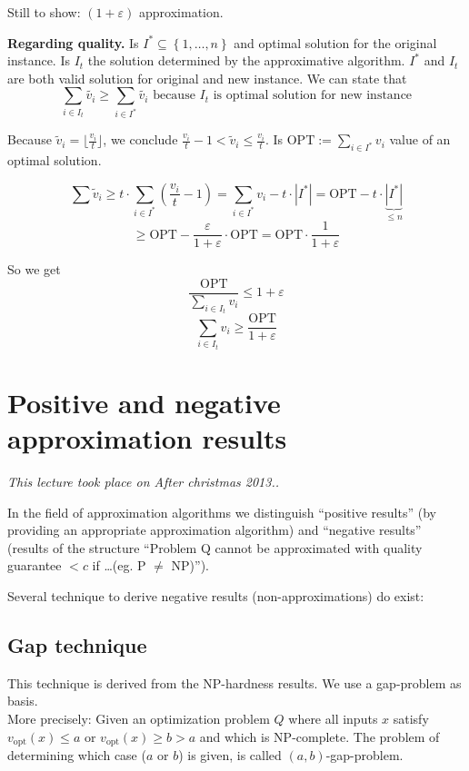 \documentclass[a4paper]{article}
\newcommand{\cls}[1]{\rm{#1}}
\newcommand{\set}[1]{\left\{#1\right\}}
\newcommand{\dateref}[1]{\emph{This lecture took place on #1.}\par}
\begin{document}
Still to show: $(1 + \varepsilon)$ approximation.

\textbf{Regarding quality.}
  Is $I^* \subseteq \set{1, \ldots, n}$ and optimal solution for the original instance.
  Is $I_t$ the solution determined by the approximative algorithm.
  $I^*$ and $I_t$ are both valid solution for original and new instance.
  We can state that
  \[
    \sum_{i \in I_t} \tilde{v_i} \geq \sum_{i \in I^*} \tilde{v_i}
    \text{ because $I_t$ is optimal solution for new instance}
  \]

Because $\tilde v_i = \lfloor \frac{v_i}{t} \rfloor$, we conclude
$\frac{v_i}{t} - 1 < \tilde v_i \leq \frac{v_i}{t}$.
Is $\text{OPT} := \sum_{i \in I^*} v_i$ value of an optimal solution.

\[
  \sum \tilde v_i \geq t \cdot \sum_{i \in I^*} (\frac{v_i}{t} - 1)
    = \sum_{i \in I^*} v_i - t \cdot |I^*|
    = \text{OPT} - t \cdot \underbrace{|I^*|}_{\leq n}
\] \[
  \geq \text{OPT} - \frac{\varepsilon}{1 + \varepsilon} \cdot \text{OPT}
    = \text{OPT} \cdot \frac{1}{1 + \varepsilon}
\]

So we get
\[
  \frac{\text{OPT}}{\sum_{i \in I_t} v_i} \leq 1 + \varepsilon
\] \[
  \sum_{i \in I_t} v_i \geq \frac{\text{OPT}}{1 + \varepsilon}
\]

\section{Positive and negative approximation results}
\dateref{After christmas 2013.}
%
In the field of approximation algorithms we distinguish ``positive results''
(by providing an appropriate approximation algorithm) and ``negative results''
(results of the structure ``Problem Q cannot be approximated with quality guarantee
$< c$ if \dots (eg. P $\neq$ \cls{NP})'').

Several technique to derive negative results (non-approximations) do exist:

\subsection{Gap technique}
%
This technique is derived from the \cls{NP}-hardness results.
We use a gap-problem as basis. \\
More precisely: Given an optimization problem $Q$ where all inputs $x$ satisfy
$v_{\text{opt}}(x) \leq a$ or $v_{\text{opt}}(x) \geq b > a$ and which
is \cls{NP}-complete. The problem of determining which case ($a$ or $b$) is given,
is called $(a, b)$-gap-problem.
\end{document}
